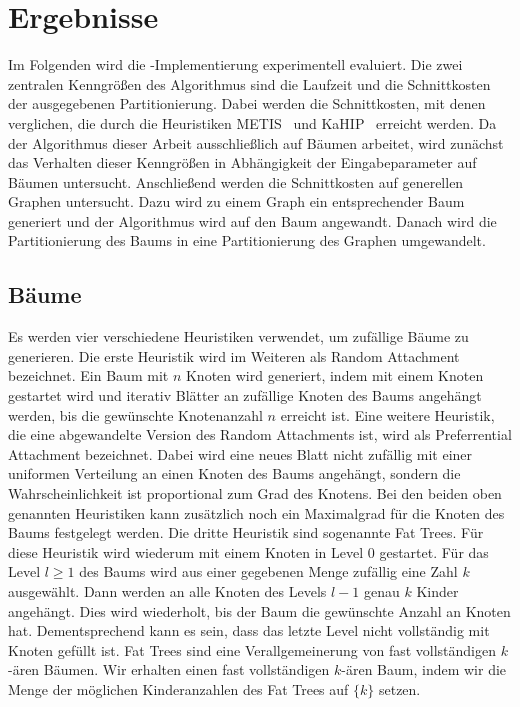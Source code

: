 
\chapter{Ergebnisse}\label{chapter:ergebnisse}
Im Folgenden wird die \Cpp\hyp Implementierung experimentell evaluiert.
Die zwei zentralen Kenngrößen des Algorithmus sind die Laufzeit und die Schnittkosten der ausgegebenen Partitionierung.
Dabei werden die Schnittkosten, mit denen verglichen, die durch die Heuristiken METIS~\cite{KK98} und KaHIP~\cite{SS13} erreicht werden.
Da der Algorithmus dieser Arbeit ausschließlich auf Bäumen arbeitet, wird zunächst das Verhalten dieser Kenngrößen in Abhängigkeit der Eingabeparameter auf Bäumen untersucht.
Anschließend werden die Schnittkosten auf generellen Graphen untersucht.
Dazu wird zu einem Graph ein entsprechender Baum generiert und der Algorithmus wird auf den Baum angewandt.
Danach wird die Partitionierung des Baums in eine Partitionierung des Graphen umgewandelt.

\section{Bäume}
Es werden vier verschiedene Heuristiken verwendet, um zufällige Bäume zu generieren.
Die erste Heuristik wird im Weiteren als Random Attachment bezeichnet. 
Ein Baum mit $n$ Knoten wird generiert, indem mit einem Knoten gestartet wird und iterativ Blätter an zufällige Knoten des Baums angehängt werden, bis die gewünschte Knotenanzahl $n$ erreicht ist.
Eine weitere Heuristik, die eine abgewandelte Version des Random Attachments ist, wird als Preferrential Attachment bezeichnet.
Dabei wird eine neues Blatt nicht zufällig mit einer uniformen Verteilung an einen Knoten des Baums angehängt, sondern die Wahrscheinlichkeit ist proportional zum Grad des Knotens.
Bei den beiden oben genannten Heuristiken kann zusätzlich noch ein Maximalgrad für die Knoten des Baums festgelegt werden.
Die dritte Heuristik sind sogenannte Fat Trees.
Für diese Heuristik wird wiederum mit einem Knoten in Level $0$ gestartet.
Für das Level $l \geq 1$ des Baums wird aus einer gegebenen Menge zufällig eine Zahl $k$ ausgewählt.
Dann werden an alle Knoten des Levels $l - 1$ genau $k$ Kinder angehängt.
Dies wird wiederholt, bis der Baum die gewünschte Anzahl an Knoten hat. 
Dementsprechend kann es sein, dass das letzte Level nicht vollständig mit Knoten gefüllt ist.
Fat Trees sind eine Verallgemeinerung von fast vollständigen $k$\hyp ären Bäumen.
Wir erhalten einen fast vollständigen $k$\hyp ären Baum, indem wir die Menge der möglichen Kinderanzahlen des Fat Trees auf $\{k\}$ setzen.

